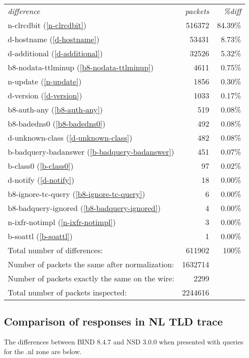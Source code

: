 \documentclass[twoside,titlepage,english]{nlnetlabs}
\begin{document}
\begin{tabular}{lrr}
{\em difference}			& {\em packets} & {\em \%diff}	\\
n-clrcdbit (\ref{n-clrcdbit})	&         516372 &84.39\% \\
d-hostname (\ref{d-hostname})	&         53431  &8.73\% \\
d-additional (\ref{d-additional})	& 32526  &5.32\% \\
b8-nodata-ttlminup (\ref{b8-nodata-ttlminup})	& 4611  &0.75\% \\
n-update (\ref{n-update})	&         1856  &0.30\% \\
d-version (\ref{d-version})	&         1033  &0.17\% \\
b8-auth-any (\ref{b8-auth-any})	&         519  &0.08\% \\
b8-badedns0 (\ref{b8-badedns0})	&         492  &0.08\% \\
d-unknown-class (\ref{d-unknown-class})	& 482  &0.08\% \\
b-badquery-badanswer (\ref{b-badquery-badanswer})	& 451  &0.07\% \\
b-class0 (\ref{b-class0})	&         97  &0.02\% \\
d-notify (\ref{d-notify})	&         18  &0.00\% \\
b8-ignore-tc-query (\ref{b8-ignore-tc-query})	& 6  &0.00\% \\
b8-badquery-ignored (\ref{b8-badquery-ignored})	& 4  &0.00\% \\
n-ixfr-notimpl (\ref{n-ixfr-notimpl})	& 3  &0.00\% \\
b-soattl (\ref{b-soattl})	&         1  &0.00\% \\
Total number of differences: 		&	 611902	&100\% \\
Number of packets the same after normalization:&1632714 \\
Number of packets exactly the same on the wire:&   2299 \\
Total number of packets inspected: 	       &2244616 \\
\end{tabular}


\subsection{Comparison of responses in NL TLD trace}

The differences between BIND 8.4.7 and NSD 3.0.0 when presented
with queries for the .nl zone are below.
\end{document}
